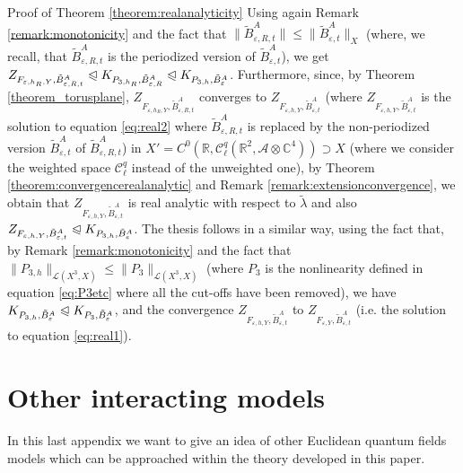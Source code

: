\documentclass{article}
\newenvironment{proof*}[1]{\noindent\textbf{#1\ }}{\hspace*{\fill}$\Box$\medskip}
\begin{document}
\begin{proof*}{Proof of Theorem \ref{theorem:realanalyticity}}
  Using again Remark \ref{remark:monotonicity} and the fact that $\|
  \tilde{B}^A_{\varepsilon, R, t} \| \leqslant \| \tilde{B}^A_{\varepsilon, t}
  \|_X$ (where, we recall, that $\tilde{B}^A_{\varepsilon, R, t}$ is the
  periodized version of $\tilde{B}^A_{\varepsilon, t}$), we get
  $Z_{F_{\varepsilon, h_R, Y}, \tilde{B}^A_{\varepsilon, R, t}}
  \trianglelefteqslant K_{P_{3, h_R}, \tilde{B}^A_{\varepsilon, R}}
  \trianglelefteqslant K_{P_{3, h}, \tilde{B}^A_{\varepsilon}}$. Furthermore,
  since, by Theorem \ref{theorem_torusplane}, $Z_{F_{\varepsilon, h_R, Y},
  \tilde{B}^A_{\varepsilon, R, t}}$ converges to $Z_{F_{\varepsilon, h, Y},
  \tilde{B}^A_{\varepsilon, t}}$ (where $Z_{F_{\varepsilon, h, Y},
  \tilde{B}^A_{\varepsilon, t}}$ is the solution to equation
  {\eqref{eq:real2}} where $\tilde{B}^A_{\varepsilon, R, t}$ is replaced by
  the non-periodized version $\tilde{B}^A_{\varepsilon, t}$ of
  $\tilde{B}^A_{\varepsilon, R, t}$) in $X' = C^0 (\mathbb{R},
  \mathcal{C}^q_{\ell} (\mathbb{R}^2, \mathcal{A} \otimes \mathbb{C}^4))
  \supset X$ (where we consider the weighted space $\mathcal{C}^q_{\ell}$
  instead of the unweighted one), by Theorem
  \ref{theorem:convergencerealanalytic} and Remark
  \ref{remark:extensionconvergence}, we obtain that $Z_{F_{\varepsilon, h, Y},
  \tilde{B}^A_{\varepsilon, t}}$ is real analytic with respect to
  $\tilde{\lambda}$ and also $Z_{F_{\varepsilon, h, Y},
  \tilde{B}^A_{\varepsilon, t}} \trianglelefteqslant K_{P_{3, h},
  \tilde{B}^A_{\varepsilon}}$. The thesis follows in a similar way, using the
  fact that, by Remark \ref{remark:monotonicity} and the fact that $\| P_{3,
  h} \|_{\mathcal{L} (X^3, X)} \leqslant \| P_3 \|_{\mathcal{L} (X^3, X)}$
  (where $P_3$ is the nonlinearity defined in equation {\eqref{eq:P3etc}}
  where all the cut-offs have been removed), we have $K_{P_{3, h},
  \tilde{B}^A_{\varepsilon}} \trianglelefteqslant K_{P_3,
  \tilde{B}^A_{\varepsilon}}$, and the convergence $Z_{F_{\varepsilon, h, Y},
  \tilde{B}^A_{\varepsilon, t}}$ to $Z_{F_{\varepsilon, Y},
  \tilde{B}^A_{\varepsilon, t}}$ (i.e. the solution to equation
  {\eqref{eq:real1}}).
\end{proof*}

\section{Other interacting models}\label{appendix_models}

In this last appendix we want to give an idea of other Euclidean quantum
fields models which can be approached within the theory developed in this
paper.
\end{document}
